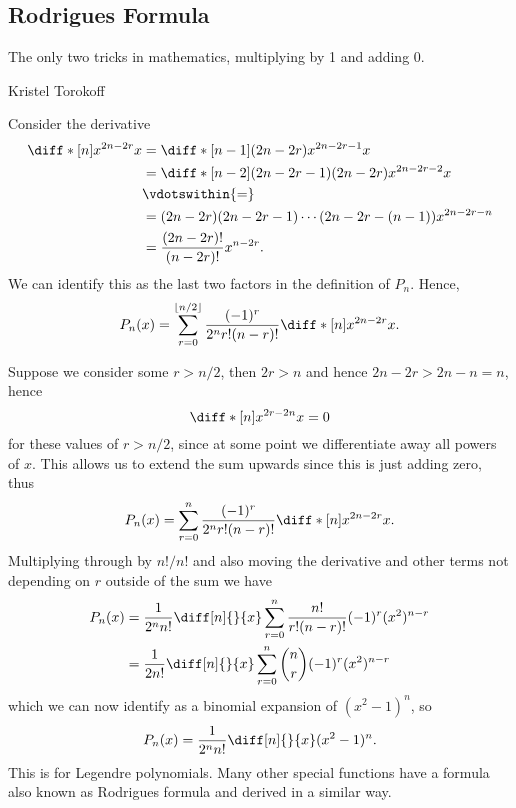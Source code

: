 \documentclass[fleqn]{NotesClass}
\begin{document}
    \subsection{Rodrigues Formula}
    \epigraph{The only two tricks in mathematics, multiplying by 1 and adding 0.}{Kristel Torokoff}
    Consider the derivative
    \begin{align}
        \diff*[n]{x^{2n - 2r}}{x} &= \diff*[n-1]{(2n - 2r)x^{2n-2r-1}}{x}\\
        &= \diff*[n-2]{(2n - 2r - 1)(2n - 2r)x^{2n - 2r - 2}}{x}\\
        &\vdotswithin{=} \\
        &= (2n - 2r)(2n - 2r - 1) \dotsm (2n - 2r - (n - 1))x^{2n - 2r - n}\\
        &= \frac{(2n - 2r)!}{(n - 2r)!}x^{n - 2r}.
    \end{align}
    We can identify this as the last two factors in the definition of \(P_n\).
    Hence,
    \begin{equation}
        P_n(x) = \sum_{r=0}^{\lfloor n/2 \rfloor} \frac{(-1)^{r}}{2^nr!(n - r)!} \diff*[n]{x^{2n - 2r}}{x}.
    \end{equation}

    Suppose we consider some \(r > n/2\), then \(2r > n\) and hence \(2n - 2r > 2n - n = n\), hence
    \begin{equation}
        \diff*[n]{x^{2r - 2n}}{x} = 0
    \end{equation}
    for these values of \(r > n/2\), since at some point we differentiate away all powers of \(x\).
    This allows us to extend the sum upwards since this is just adding zero, thus
    \begin{equation}
        P_n(x) = \sum_{r=0}^{n} \frac{(-1)^r}{2^nr!(n - r)!} \diff*[n]{x^{2n - 2r}}{x}.
    \end{equation}
    Multiplying through by \(n!/n!\) and also moving the derivative and other terms not depending on \(r\) outside of the sum we have
    \begin{align}
        P_n(x) &= \frac{1}{2^nn!} \diff[n]{}{x} \sum_{r=0}^{n} \frac{n!}{r!(n - r)!} (-1)^r (x^2)^{n - r}\\
        &= \frac{1}{2n!} \diff[n]{}{x} \sum_{r=0}^{n} \binom{n}{r} (-1)^{r}(x^2)^{n - r}
    \end{align}
    which we can now identify as a binomial expansion of \((x^2 - 1)^n\), so
    \begin{equation}\label{eqn:rodrigues formula legendre polynomials}
        P_n(x) = \frac{1}{2^nn!} \diff[n]{}{x}(x^2 - 1)^n.
    \end{equation}
    This is  for Legendre polynomials.
    Many other special functions have a formula also known as Rodrigues formula and derived in a similar way.
    
\end{document}
